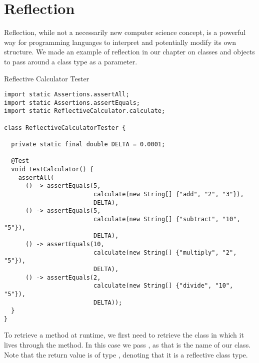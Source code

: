 \section{Reflection}

Reflection, while not a necessarily new computer science concept, is a powerful way for programming languages to interpret and potentially modify its own structure. We made an example of reflection in our chapter on classes and objects to pass around a class type as a parameter. 


\begin{cl}[]{Reflective Calculator Tester}
\begin{lstlisting}[language=MyJava]
import static Assertions.assertAll;
import static Assertions.assertEquals;
import static ReflectiveCalculator.calculate;

class ReflectiveCalculatorTester {

  private static final double DELTA = 0.0001;

  @Test
  void testCalculator() {
    assertAll(
      () -> assertEquals(5, 
                         calculate(new String[] {"add", "2", "3"}), 
                         DELTA),
      () -> assertEquals(5, 
                         calculate(new String[] {"subtract", "10", "5"}), 
                         DELTA),
      () -> assertEquals(10, 
                         calculate(new String[] {"multiply", "2", "5"}), 
                         DELTA),
      () -> assertEquals(2, 
                         calculate(new String[] {"divide", "10", "5"}), 
                         DELTA));
  }
}
\end{lstlisting}
\end{cl}

To retrieve a method at runtime, we first need to retrieve the class in which it lives through the  method. In this case we pass , as that is the name of our class. Note that the return value is of type , denoting that it is a reflective class type.

